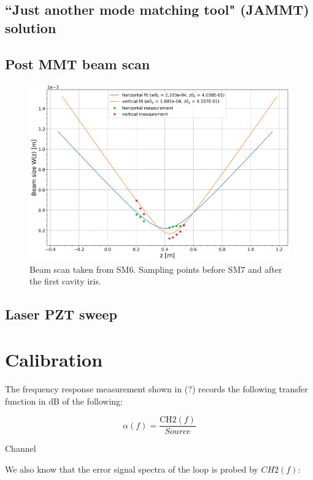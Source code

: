 \subsection{``Just another mode matching tool" (JAMMT) solution}


\subsection{Post MMT beam scan}

\begin{figure}[H]
\includegraphics[width=\textwidth]{figs/ALGAAS/beamscans/01_12_2021_postMMT.png}
\caption{Beam scan taken from SM6. Sampling points before SM7 and after the first cavity iris.}
\label{fig:macor_mount_design}
\end{figure}

\subsection{Laser PZT sweep}



\section{Calibration}\label{sec:calibration_math}
The frequency response measurement shown in (?) records the following transfer function in dB of the following:

\begin{equation}
\alpha(f) = \frac{\mathrm{CH2}(f)}{Source}
\end{equation}

Channel

We also know that the error signal spectra of the loop is probed by $CH2(f)$:


